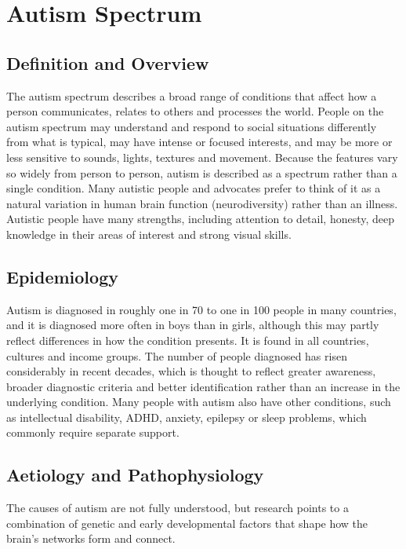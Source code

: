 \chapter{Autism Spectrum}

\section*{Definition and Overview}
The autism spectrum describes a broad range of conditions that affect how a person communicates, relates to others and processes the world. People on the autism spectrum may understand and respond to social situations differently from what is typical, may have intense or focused interests, and may be more or less sensitive to sounds, lights, textures and movement. Because the features vary so widely from person to person, autism is described as a spectrum rather than a single condition. Many autistic people and advocates prefer to think of it as a natural variation in human brain function (neurodiversity) rather than an illness. Autistic people have many strengths, including attention to detail, honesty, deep knowledge in their areas of interest and strong visual skills.

\section*{Epidemiology}
Autism is diagnosed in roughly one in 70 to one in 100 people in many countries, and it is diagnosed more often in boys than in girls, although this may partly reflect differences in how the condition presents. It is found in all countries, cultures and income groups. The number of people diagnosed has risen considerably in recent decades, which is thought to reflect greater awareness, broader diagnostic criteria and better identification rather than an increase in the underlying condition. Many people with autism also have other conditions, such as intellectual disability, ADHD, anxiety, epilepsy or sleep problems, which commonly require separate support.

\section*{Aetiology and Pathophysiology}
The causes of autism are not fully understood, but research points to a combination of genetic and early developmental factors that shape how the brain's networks form and connect.

